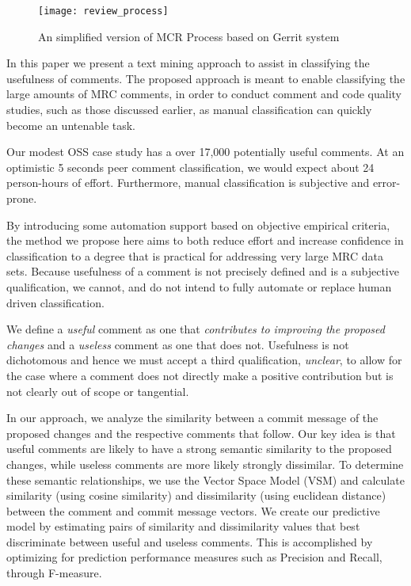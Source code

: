 \begin{figure}[!t]
\centering
\texttt{[image: review\_process]}
\caption{An simplified version of MCR Process based on Gerrit system}
\label{fig:process}
\end{figure}

In this paper we present a text mining approach to assist in classifying the usefulness of comments.
The proposed approach is meant to enable classifying the large amounts of MRC comments, in order to conduct comment and code quality studies, such as those discussed earlier, as manual classification can quickly become an untenable task.

Our modest OSS case study has a over 17,000 potentially useful comments.
At an optimistic 5 seconds peer comment classification, we would expect about 24 person-hours of effort.
Furthermore, manual classification is subjective and error-prone.

By introducing some automation support based on objective empirical criteria,
the method we propose here aims to both reduce effort and increase confidence in classification to a degree that is practical for addressing very large MRC data sets.
Because usefulness of a comment is not precisely defined and is a subjective qualification, we cannot, and do not intend to fully automate or replace human driven classification.  

We define a \emph{useful} comment as one that \emph{contributes to improving the proposed changes} and a \emph{useless} comment as one that does not.
Usefulness is not dichotomous and hence we must accept a third qualification, \emph{unclear}, to allow for the case where a comment does not directly make a positive contribution but is not clearly out of scope or tangential.

In our approach, we analyze the similarity between a commit message of the proposed changes and the respective comments that follow.
Our key idea is that useful comments are likely to have a strong semantic similarity to the proposed changes, while useless comments are more likely strongly dissimilar.
To determine these semantic relationships, we use the Vector Space Model (VSM) and calculate similarity (using cosine similarity) and dissimilarity (using euclidean distance) between the comment and commit message vectors. 
We create our predictive model by estimating pairs of similarity and dissimilarity values that best discriminate between useful and useless comments.
This is accomplished by optimizing for prediction performance measures such as Precision and Recall, through F-measure.

